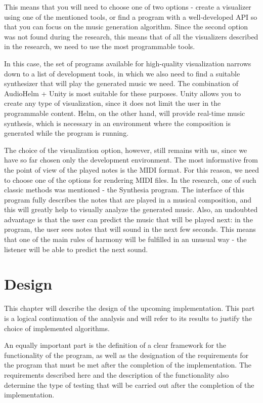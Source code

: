 \documentclass[thesis=B,english]{FITthesis}[2019/12/23]
\begin{document}
This means that you will need to choose one of two options - create a visualizer using one of the mentioned tools, or find a program with a well-developed API so that you can focus on the music generation algorithm. Since the second option was not found during the research, this means that of all the visualizers described in the research, we need to use the most programmable tools.

In this case, the set of programs available for high-quality visualization narrows down to a list of development tools, in which we also need to find a suitable synthesizer that will play the generated music we need. The combination of AudioHelm + Unity is most suitable for these purposes. Unity allows you to create any type of visualization, since it does not limit the user in the programmable content. Helm, on the other hand, will provide real-time music synthesis, which is necessary in an environment where the composition is generated while the program is running.

The choice of the visualization option, however, still remains with us, since we have so far chosen only the development environment. The most informative from the point of view of the played notes is the MIDI format. For this reason, we need to choose one of the options for rendering MIDI files. In the research, one of such classic methods was mentioned - the Synthesia program. The interface of this program fully describes the notes that are played in a musical composition, and this will greatly help to visually analyze the generated music. Also, an undoubted advantage is that the user can predict the music that will be played next: in the program, the user sees notes that will sound in the next few seconds. This means that one of the main rules of harmony will be fulfilled in an unusual way - the listener will be able to predict the next sound.

\chapter{Design}

This chapter will describe the design of the upcoming implementation. This part is a logical continuation of the analysis and will refer to its results to justify the choice of implemented algorithms.

An equally important part is the definition of a clear framework for the functionality of the program, as well as the designation of the requirements for the program that must be met after the completion of the implementation. The requirements described here and the description of the functionality also determine the type of testing that will be carried out after the completion of the implementation.
\end{document}
